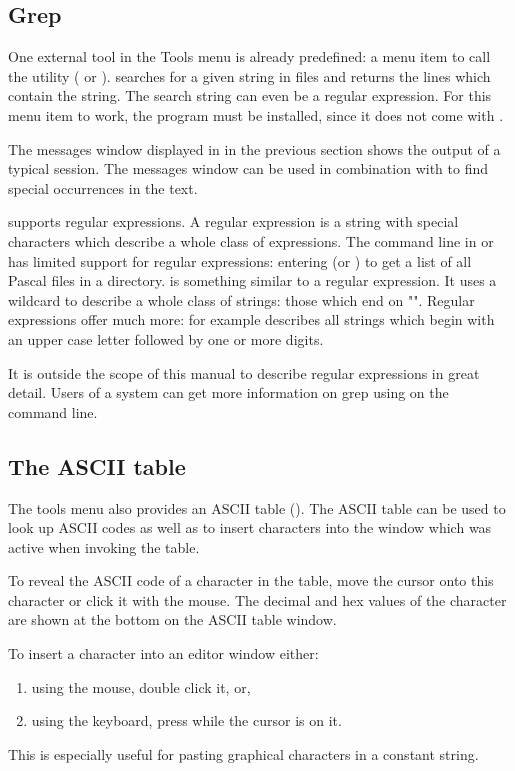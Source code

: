 \subsection{Grep}
\label{se:grep}
One external tool in the Tools menu is already predefined: a
menu item to call the  utility ( or
).  searches for a given string in files and
returns the lines which contain the string. The search string can
even be a regular expression. For this menu item to work, the
 program must be installed, since it does not come with \fpc.

The messages window displayed in  in the previous
section shows the output of a typical  session. The messages
window can be used in combination with  to find special
occurrences in the text.

 supports regular expressions. A regular expression is a
string with special characters which describe a whole class of
expressions. The command line in \dos or \linux has limited
support for regular expressions: entering 
(or ) to get a list of all Pascal files in a
directory.  is something similar to a regular expression.
It uses a wildcard to describe a whole class of strings: those which
end on "".
Regular expressions offer much more: for example \var{[A-Z][0-9]+}
describes all strings which begin with an upper case letter followed by
one or more digits.

It is outside the scope of this manual to describe regular expressions
in great detail. Users of a \linux system can get more information on grep
using  on the command line.
%
%
\subsection{The ASCII table}
\label{se:asciitable}
The tools menu also provides an ASCII table ().
The ASCII table can be used to look up ASCII codes as well as to
insert characters into the window which was active when invoking the
table. 

To reveal the ASCII code of a character in the table, move the
cursor onto this character or click it with the mouse. The decimal
and hex values of the character are shown at the bottom on the
ASCII table window.

To insert a character into an editor window either:
\begin{enumerate}
\item using the mouse, double click it, or,
\item using the keyboard,  press  while the cursor is on it.
\end{enumerate}
This is especially useful for pasting graphical characters in a constant
string.

